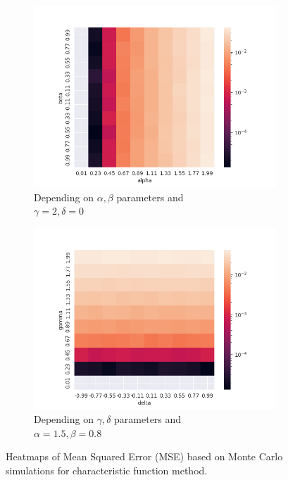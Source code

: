 \documentclass{article}
\begin{document}
		\subsubsection{}
		\begin{figure}[H]
			\begin{subfigure}{.5\textwidth}
				\centering
				\includegraphics[width=1\linewidth]{images/heatmap_cf_MSE_alpha_beta.png}
				\caption{Depending on $\alpha, \beta$ parameters and \\$\gamma = 2, \delta = 0$}
			\end{subfigure}
			\begin{subfigure}[r]{.5\textwidth}
				\centering
				\includegraphics[width=1\linewidth]{images/heatmap_cf_MSE_gamma_delta.png}
				\caption{Depending on $\gamma, \delta$ parameters and \\$\alpha = 1.5, \beta = 0.8$}
			\end{subfigure}
			\caption{Heatmaps of Mean Squared Error (MSE) based on Monte Carlo simulations for characteristic function method.}
		\end{figure}
\end{document}
